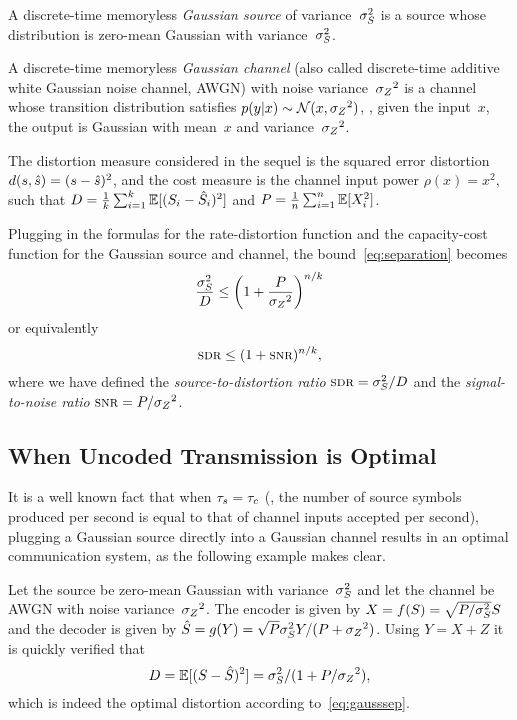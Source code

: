 \begin{definition}
  \label{def:gaussiansc}
  A discrete-time memoryless \emph{Gaussian source} of variance~${\sigma_S^2}$ is a
  source whose distribution is zero-mean Gaussian with variance~${\sigma_S^2}$.

  A discrete-time memoryless \emph{Gaussian channel} (also called discrete-time
  additive white Gaussian noise channel, AWGN) with noise variance~${{\sigma_Z}^2}$ is a
  channel whose transition distribution satisfies $p(y|x) \sim \mathcal{N}(x, {{\sigma_Z}^2})$,
  \ie, given the input~$x$, the output is Gaussian with mean~$x$ and
  variance~${{\sigma_Z}^2}$.
\end{definition}

The distortion measure considered in the sequel is the squared error distortion
$d(s,{\hat{s}}) = (s - {\hat{s}})^2$, and the cost measure is the channel input power
$\rho(x) = x^2$, such that $D = \frac1k \sum_{i=1}^k \mathbb{E}[(S_i - {\hat{S}}_i)^2]$ and $P
= \frac1n \sum_{i=1}^n \mathbb{E}[X_i^2]$.

Plugging in the formulas for the rate-distortion function and the capacity-cost
function for the Gaussian source and channel, the bound~\eqref{eq:separation}
becomes
\begin{equation}
  \label{eq:gausssep}
  \frac{{\sigma_S^2}}{D} \le \left( 1 + \frac{P}{{{\sigma_Z}^2}} \right)^{n/k}
\end{equation}
or equivalently
\begin{equation}
  \label{eq:gausssepsdr}
  \sdr \le (1 + \snr)^{n/k},
\end{equation}
where we have defined the \emph{source-to-distortion ratio} $\sdr = \ssq/D$ and
the \emph{signal-to-noise ratio} $\snr = P/\szq$. 


\subsection{When Uncoded Transmission is Optimal}\label{sec:gaussuncoded}

It is a well known fact that when ${\tau_s} = {\tau_c}$ (\ie, the number of source symbols
produced per second is equal to that of channel inputs accepted per second),
plugging a Gaussian source directly into a Gaussian channel results in an
optimal communication system, as the following example makes clear.

\begin{example}
  \label{ex:gausssingle}
  Let the source be zero-mean Gaussian with variance~${\sigma_S^2}$ and let the channel
  be AWGN with noise variance~${{\sigma_Z}^2}$. The encoder is given by $X =
  f(S) = \sqrt{P/{\sigma_S^2}} S$ and the decoder is given by ${\hat{S}} = g(Y) = \sqrt{P}
  {\sigma_S^2} Y / (P + {{\sigma_Z}^2})$. Using $Y = X + Z$ it is quickly verified that
  \begin{equation*}
    D = \mathbb{E}[(S - {\hat{S}})^2] = {\sigma_S^2} / (1 + P/{{\sigma_Z}^2}),
  \end{equation*}
  which is indeed the optimal distortion according to~\eqref{eq:gausssep}.
\end{example}

